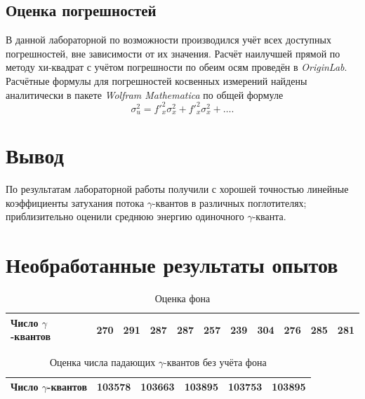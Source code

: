 \documentclass[a4paper]{article}
\begin{document}
\subsection{Оценка погрешностей}

В данной лабораторной по возможности производился учёт всех доступных погрешностей, вне зависимости от их значения. Расчёт наилучшей прямой по методу хи-квадрат с учётом погрешности по обеим осям проведён в \emph{OriginLab}. Расчётные формулы для погрешностей косвенных измерений найдены аналитически в пакете \emph{Wolfram Mathematica} по общей формуле \[\sigma_u^2 = f'^2_{x} \sigma_x^2 + f'^2_x \sigma_x^2 + \ldots. \]

\section{Вывод}

По результатам лабораторной работы получили с хорошей точностью линейные коэффициенты затухания потока $ \gamma $-квантов в различных поглотителях; приблизительно оценили среднюю энергию одиночного $ \gamma $-кванта.

\newpage
\appendix

\section{Необработанные результаты опытов}

\begin{table}[h]
	\centering
	\begin{tabular}{|l|l|l|l|l|l|l|l|l|l|l|}
		\hline
		Число $\gamma$-квантов & 270 & 291 & 287 & 287 & 257 & 239 & 304 & 276 & 285 & 281 \\ \hline
	\end{tabular}
	\caption{Оценка фона}
	\label{tab:rawPhone}
\end{table}

\begin{table}[h]
	\centering
	\begin{tabular}{|l|l|l|l|l|l|}
		\hline
		Число $\gamma$-квантов & 103578 & 103663 & 103895 & 103753 & 103895 \\ \hline
	\end{tabular}
	\caption{Оценка числа падающих $\gamma$-квантов без учёта фона}
	\label{tab:rawN0}
\end{table}
\end{document}

